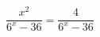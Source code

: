 \begin{ex}[type=equation]
	\begin{condition}
		\( \dfrac{x^2}{6^x-36}=\dfrac{4}{6^x-36} \)
	\end{condition}
\end{ex}